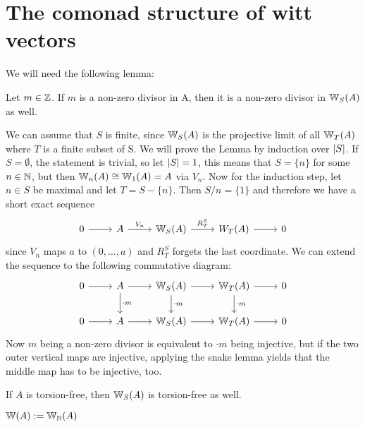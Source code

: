 \section{The comonad structure of witt vectors}
We will need the following lemma:
\begin{lemma}\label{lem: non-zero divisor}
    Let $m \in \mathbb{Z}$. If $m$ is a non-zero divisor in A, then it is a
    non-zero divisor in $\mathbb{W}_S(A)$ as well.
\end{lemma}
\begin{beweis}
    We can assume that $S$ is finite, since $\mathbb{W}_S(A)$ is the projective limit
    of all $\mathbb{W}_T(A)$ where $T$ is a finite subset of S.
    We will prove the Lemma by induction over $\lvert S\rvert$.
    If $S = \emptyset$, the statement is trivial, so let $\lvert S\rvert = 1$, this means
    that $S = \{n\}$ for some $n \in \mathbb{N}$, but then $\mathbb{W}_{n}(A) \cong \mathbb{W}_{1}(A) = A$ via $V_n$.
    Now for the induction step, let $n \in S$ be maximal and let $T = S - \{n\}$.
    Then $S/n = \{1\}$ and therefore we have a short exact sequence 
    \[
    \begin{tikzcd}
        0 \arrow[r]
          & A \arrow[r,"V_n"]
            & \W_S(A) \arrow[r,"R_T^S"]
              & W_T(A) \arrow[r]
                & 0
    \end{tikzcd}
    \]
    since $V_n$ maps $a$ to $(0,\dots,a)$ and $R_T^S$ forgets the last coordinate.
    We can extend the sequence to the following commutative diagram:
    \[
    \begin{tikzcd}
        0 \arrow[r] 
        & A \arrow[r] \arrow[d,"\cdot m"] 
          & \W_S(A) \arrow[r] \arrow[d,"\cdot m"]
            & \W_T(A) \arrow[d,"\cdot m"] \arrow[r]
                & 0 \\
        0 \arrow[r]
           & A \arrow[r]
            & \W_S(A) \arrow[r]
              & \W_T(A) \arrow[r]
                & 0 
    \end{tikzcd}
    \]
    Now $m$ being a non-zero divisor is equivalent to $\cdot m$ being injective, but if the
    two outer vertical maps are injective, applying the snake lemma yields that the middle map has to be 
    injective, too.
\end{beweis}
\begin{cor} 
    \label{cor: A torsion-free implies W(A) torsion-free}
    If $A$ is torsion-free, then $\mathbb{W}_S(A)$ is torsion-free as well.
\end{cor}
\begin{definition}
    $\mathbb{W}(A) := \mathbb{W}_{\mathbb{N}}(A)$
\end{definition}
